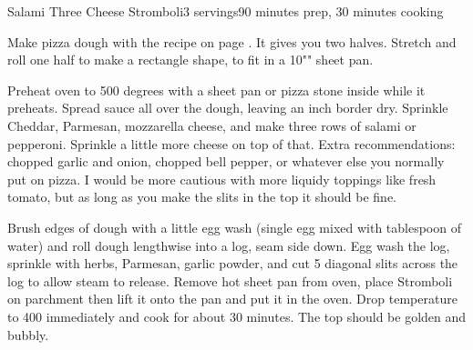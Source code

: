 \documentclass[../Cookbook.tex]{subfiles}
\begin{document}
\begin{recipe}{Salami Three Cheese Stromboli}{3 servings}{90 minutes prep, 30 minutes cooking}

Make pizza dough with the recipe on page \pageref{PizzaDough}.
It gives you two halves. Stretch and roll one half to make a rectangle shape, to fit in a 10"" sheet pan.

Preheat oven to 500 degrees with a sheet pan or pizza stone inside while it preheats.
Spread sauce all over the dough, leaving an inch border dry. Sprinkle Cheddar, Parmesan, mozzarella cheese, and make three rows of salami or pepperoni. Sprinkle a little more cheese on top of that.
Extra recommendations: chopped garlic and onion, chopped bell pepper, or whatever else you normally put on pizza. I would be more cautious with more liquidy toppings like fresh tomato, but as long as you make the slits in the top it should be fine.

Brush edges of dough with a little egg wash (single egg mixed with tablespoon of water) and roll dough lengthwise into a log, seam side down.
Egg wash the log, sprinkle with herbs, Parmesan, garlic powder, and cut 5 diagonal slits across the log to allow steam to release.
Remove hot sheet pan from oven, place Stromboli on parchment then lift it onto the pan and put it in the oven. Drop temperature to 400 immediately and cook for about 30 minutes. The top should be golden and bubbly.

\end{recipe}
\end{document}
